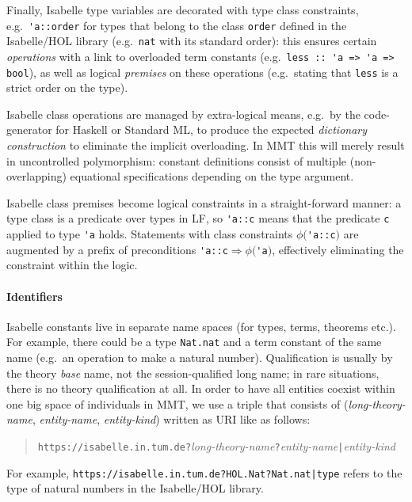 Finally, Isabelle type variables are decorated with type class constraints,
e.g.\ \verb,'a::order, for types that belong to the class \verb,order,
defined in the Isabelle/HOL library (e.g.\ \verb,nat, with its
standard order): this ensures certain \emph{operations} with a link to
overloaded term constants (e.g.\ \verb,less :: 'a => 'a => bool,), as
well as logical \emph{premises} on these operations (e.g.\ stating
that \verb,less, is a strict order on the type).

Isabelle class operations are managed by extra-logical means, e.g.\ by
the code-generator for Haskell or Standard ML, to produce the expected
\emph{dictionary construction} to eliminate the implicit
overloading. In MMT this will merely result in uncontrolled
polymorphism: constant definitions consist of multiple
(non-overlapping) equational specifications depending on the type
argument.

Isabelle class premises become logical constraints in a
straight-forward manner: a type class is a predicate over types in LF,
so \verb,'a::c, means that the predicate \verb,c, applied to type
\verb,'a, holds. Statements with class constraints
$\phi($\verb,'a::c,$)$ are augmented by a prefix of preconditions
\verb,'a::c,${} \Longrightarrow \phi($\verb,'a,$)$, effectively
eliminating the constraint within the logic.

\paragraph{Identifiers}
Isabelle constants live in separate name spaces (for types, terms,
theorems etc.).  For example, there could be a type \verb,Nat.nat, and
a term constant of the same name (e.g.\ an operation to make a natural
number). Qualification is usually by the theory \emph{base} name, not
the session-qualified long name; in rare situations, there is no
theory qualification at all. In order to have all entities coexist
within one big space of individuals in MMT, we use a triple that
consists of (\emph{long-theory-name}, \emph{entity-name},
\emph{entity-kind}) written as URI like as follows:

\begin{quote}
\texttt{https://isabelle.in.tum.de?}\emph{long-theory-name}\texttt{?}\emph{entity-name}\texttt{|}\emph{entity-kind}
\end{quote}

\noindent For example, \texttt{https://isabelle.in.tum.de?HOL.Nat?Nat.nat|type} refers to the type of natural numbers in the Isabelle/HOL library.


